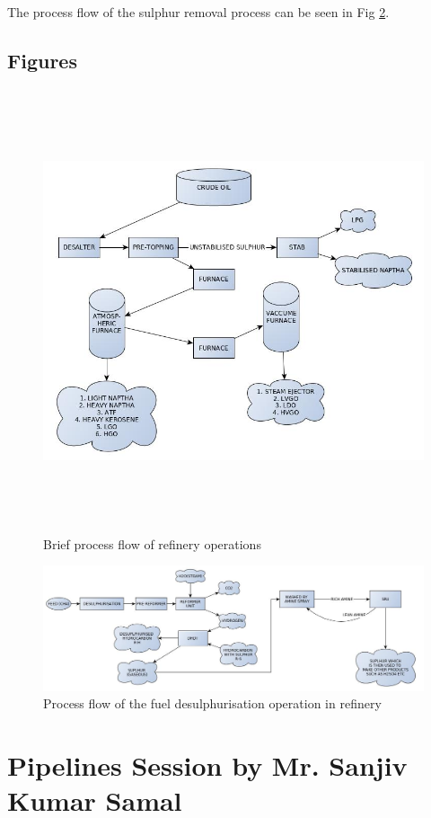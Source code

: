 \documentclass{report}
\begin{document}
	The process flow of the sulphur removal process can be seen in Fig \ref{sulphur_removal_flow}.
	\clearpage
	\pagebreak
	\section{Figures}
	\begin{figure}[h]
		\centering
		\includegraphics[width=\linewidth,height=13cm]{refinery_flow}
		\caption{Brief process flow of refinery operations}
		\label{refinery_flow}
	\end{figure}
	\begin{figure}[h]
		\centering
		\includegraphics[width=\linewidth]{sulphur_removal_flow}
		\caption{Process flow of the fuel desulphurisation operation in refinery}
		\label{sulphur_removal_flow}
	\end{figure}
	\chapter{Pipelines Session by Mr. Sanjiv Kumar Samal}
	
\end{document}
